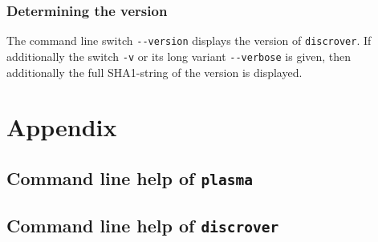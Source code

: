 \documentclass[a4paper]{article}
\newcommand{\plasma}[0]{\texttt{plasma}}
\newcommand{\discrover}[0]{\texttt{discrover}}
\begin{document}
\subsubsection{Determining the version}
The command line switch \verb|--version| displays the version of \discrover{}.
If additionally the switch \verb|-v| or its long variant \verb|--verbose| is given, then additionally the full SHA1-string of the version is displayed.


\section{Appendix}
\subsection{Command line help of \plasma{}}
\label{appendix:plasma-cli-help}
{\small

}

\subsection{Command line help of \discrover{}}
\label{appendix:discrover-cli-help}
{\small

}



\nocite{*}
{}


\end{document}
